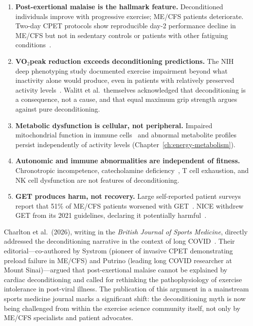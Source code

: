 \begin{enumerate}
    \item \textbf{Post-exertional malaise is the hallmark feature.} Deconditioned individuals improve with progressive exercise; ME/CFS patients deteriorate. Two-day CPET protocols show reproducible day-2 performance decline in ME/CFS but not in sedentary controls or patients with other fatiguing conditions~\cite{keller2024cpet, Lim2020}.

    \item \textbf{VO$_2$peak reduction exceeds deconditioning predictions.} The NIH deep phenotyping study documented exercise impairment beyond what inactivity alone would produce, even in patients with relatively preserved activity levels~\cite{walitt2024deep}. Walitt et al.\ themselves acknowledged that deconditioning is a consequence, not a cause, and that equal maximum grip strength argues against pure deconditioning.

    \item \textbf{Metabolic dysfunction is cellular, not peripheral.} Impaired mitochondrial function in immune cells~\cite{Mandarano2020} and abnormal metabolite profiles persist independently of activity levels (Chapter~\ref{ch:energy-metabolism}).

    \item \textbf{Autonomic and immune abnormalities are independent of fitness.} Chronotropic incompetence, catecholamine deficiency~\cite{walitt2024deep}, T cell exhaustion, and NK cell dysfunction are not features of deconditioning.

    \item \textbf{GET produces harm, not recovery.} Large self-reported patient surveys report that 51\% of ME/CFS patients worsened with GET~\cite{Kindlon2011GET}. NICE withdrew GET from its 2021 guidelines, declaring it potentially harmful~\cite{NICE2021mecfs}.
\end{enumerate}

Charlton et al.\ (2026), writing in the \textit{British Journal of Sports Medicine}, directly addressed the deconditioning narrative in the context of long COVID~\cite{Charlton2026pem}. Their editorial---co-authored by Systrom (pioneer of invasive CPET demonstrating preload failure in ME/CFS) and Putrino (leading long COVID researcher at Mount Sinai)---argued that post-exertional malaise cannot be explained by cardiac deconditioning and called for rethinking the pathophysiology of exercise intolerance in post-viral illness. The publication of this argument in a mainstream sports medicine journal marks a significant shift: the deconditioning myth is now being challenged from within the exercise science community itself, not only by ME/CFS specialists and patient advocates.

